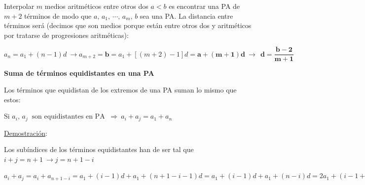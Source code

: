 \normalsize{Interpolar} $m$ medios aritméticos entre otros dos $a<b$ es encontrar una PA de $m+2$ términos de modo que $a, \, a_1,\ \cdots,\, a_m,\, b$ sea una PA. La distancia entre términos será (decimos que son medios porque están entre otros dos y aritméticos por tratarse de progresiones aritméticas):

$a_n=a_1+(n-1)d \ \to a_{m+2}=\boldsymbol b=a_1+[(m+2)-1] d= \boldsymbol{a+(m+1)d} \ \to \ \  \boldsymbol{ d=\dfrac{b-2}{m+1} }$

\vspace{5mm}\begin{large}\textbf{Suma de términos equidistantes en una PA}\end{large}

Los términos que equidistan de los extremos de una PA suman lo mismo que estos: 

$\text{Si } a_i,\, a_j \ \text{ son equidistantes en PA } \ \Rightarrow \ a_i+a_j=a_1+a_n$ 

\underline{Demostración}:

Los subíndices de los términos equidistantes han de ser tal que $i+j=n+1 \ \to j=n+1-i$

$a_i+a_j=a_i+a_{n+1-i}=a_1+(i-1)d+a_1+(n+1-i-1)d=a_1+(i-1)d+a_1+(n-i)d=2a_1+(i-1+n-i)d=2a_1+(n-1)d=a_1+a_1+(n-1)d=a_1+a_n$ \QED


